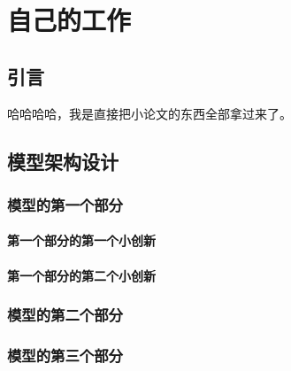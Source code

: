
\chapter{自己的工作}

\section{引言}

哈哈哈哈，我是直接把小论文的东西全部拿过来了。



\section{模型架构设计}



\subsection{模型的第一个部分}


\subsubsection{第一个部分的第一个小创新}





\subsubsection{第一个部分的第二个小创新}



\subsection{模型的第二个部分}



\subsection{模型的第三个部分}




